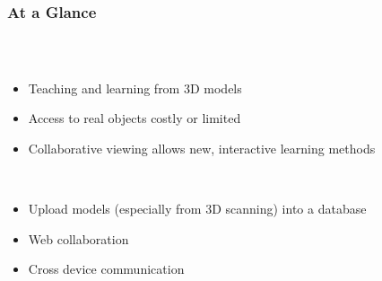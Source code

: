 \begin{frame}
  \frametitle{At a Glance}
  \begin{columns}
    \begin{column}{0.8\textwidth}
      \begin{description}[]
        \item[Why Collaborative 3D Model Viewing?] \hfill \\
        \begin{itemize}
          \item Teaching and learning from 3D models
          \item Access to real objects costly or limited
          \item Collaborative viewing allows new, interactive learning methods
        \end{itemize}

        \bigskip
        \item[Our Approach] \hfill \\
          \begin{itemize}
            \item Upload models (especially from 3D scanning) into a database
            \item Web collaboration
            \item Cross device communication
        \end{itemize}
      \end{description}
    \end{column}


\end{columns}
\end{frame}
